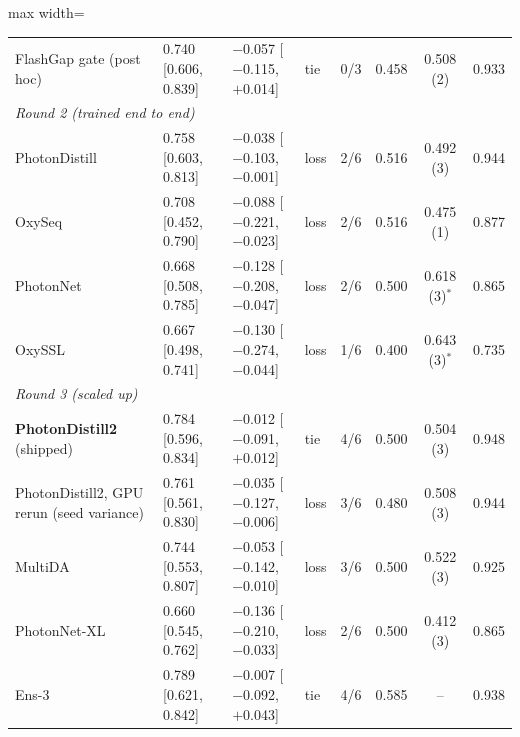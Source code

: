 {\begin{adjustbox}{max width=\linewidth}
\begin{tabular}{p{3.6cm}lllcccc}
FlashGap gate (post hoc) & 0.740 [0.606, 0.839] & $-$0.057 [$-$0.115, $+$0.014] & tie & 0/3 & 0.458 & 0.508 (2) & 0.933 \\
\multicolumn{8}{l}{\emph{Round 2 (trained end to end)}} \\
PhotonDistill & 0.758 [0.603, 0.813] & $-$0.038 [$-$0.103, $-$0.001] & loss & 2/6 & 0.516 & 0.492 (3) & 0.944 \\
OxySeq & 0.708 [0.452, 0.790] & $-$0.088 [$-$0.221, $-$0.023] & loss & 2/6 & 0.516 & 0.475 (1) & 0.877 \\
PhotonNet & 0.668 [0.508, 0.785] & $-$0.128 [$-$0.208, $-$0.047] & loss & 2/6 & 0.500 & 0.618 (3)$^{*}$ & 0.865 \\
OxySSL & 0.667 [0.498, 0.741] & $-$0.130 [$-$0.274, $-$0.044] & loss & 1/6 & 0.400 & 0.643 (3)$^{*}$ & 0.735 \\
\multicolumn{8}{l}{\emph{Round 3 (scaled up)}} \\
\textbf{PhotonDistill2} (shipped) & 0.784 [0.596, 0.834] & $-$0.012 [$-$0.091, $+$0.012] & tie & 4/6 & 0.500 & 0.504 (3) & 0.948 \\
PhotonDistill2, GPU rerun (seed variance) & 0.761 [0.561, 0.830] & $-$0.035 [$-$0.127, $-$0.006] & loss & 3/6 & 0.480 & 0.508 (3) & 0.944 \\
MultiDA & 0.744 [0.553, 0.807] & $-$0.053 [$-$0.142, $-$0.010] & loss & 3/6 & 0.500 & 0.522 (3) & 0.925 \\
PhotonNet-XL & 0.660 [0.545, 0.762] & $-$0.136 [$-$0.210, $-$0.033] & loss & 2/6 & 0.500 & 0.412 (3) & 0.865 \\
Ens-3 & 0.789 [0.621, 0.842] & $-$0.007 [$-$0.092, $+$0.043] & tie & 4/6 & 0.585 & -- & 0.938 \\
\bottomrule
\end{tabular}
\end{adjustbox}
}
